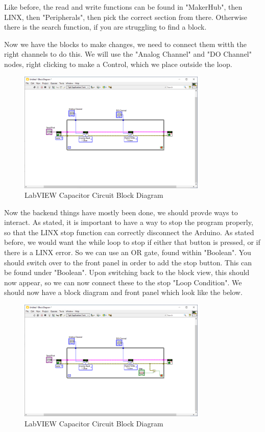\documentclass[a4paper,11pt]{report}
\begin{document}
Like before, the read and write functions can be found in "MakerHub", then LINX, then "Peripherals", then pick the correct section from there. Otherwise there is the search function, if you are struggling to find a block.

Now we have the blocks to make changes, we need to connect them witth the right channels to do this. We will use the "Analog Channel" and "DO Channel" nodes, right clicking to make a Control, which we place outside the loop.

\begin{figure}[H]
\centering
\includegraphics[width=0.8\textwidth]{screenshots/labviewcap3}
\caption{LabVIEW Capacitor Circuit Block Diagram}
\end{figure}

Now the backend things have mostly been done, we should provde ways to interact. As stated, it is important to have a way to stop the program properly, so that the LINX stop function can correctly disconnect the Arduino. As stated before, we would want the while loop to stop if either that button is pressed, or if there is a LINX error. So we can use an OR gate, found within "Boolean". You should switch over to the front panel in order to add the stop button. This can be found under "Boolean". Upon switching back to the block view, this should now appear, so we can now connect these to the stop "Loop Condition". We should now have a block diagram and front panel which look like the below.

\begin{figure}[H]
\centering
\includegraphics[width=0.8\textwidth]{screenshots/labviewcap4}
\caption{LabVIEW Capacitor Circuit Block Diagram}
\end{figure}
\end{document}
